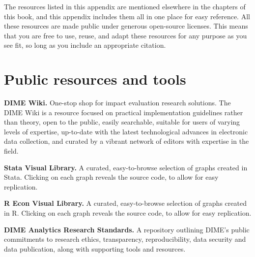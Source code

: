 
\newcommand{\resourcepar}{\vspace{.75\baselineskip}\noindent}


\begin{fullwidth}

The resources listed in this appendix
are mentioned elsewhere in the chapters of this book,
and this appendix includes them all
in one place for easy reference.
All these resources are made public
under generous open-source licenses.
This means that you are free to use, reuse, and adapt these resources
for any purpose as you see fit,
so long as you include an appropriate citation.

\end{fullwidth}


\section{Public resources and tools}

\textbf{DIME Wiki.}
One-stop shop for impact evaluation research solutions.
The DIME Wiki is a resource focused on
practical implementation guidelines rather than theory,
open to the public, easily searchable,
suitable for users of varying levels of expertise,
up-to-date with the latest technological advances
in electronic data collection,
and curated by a vibrant network of editors
with expertise in the field.

\resourcepar\textbf{Stata Visual Library.}
A curated, easy-to-browse selection of graphs created in Stata.
Clicking on each graph reveals the source code,
to allow for easy replication.

\resourcepar\textbf{R Econ Visual Library.}
A curated, easy-to-browse selection of graphs created in R.
Clicking on each graph reveals the source code,
to allow for easy replication.

\resourcepar\textbf{DIME Analytics Research Standards.}
A repository outlining DIME's public commitments to
research ethics, transparency, reproducibility,
data security and data publication,
along with supporting tools and resources.

